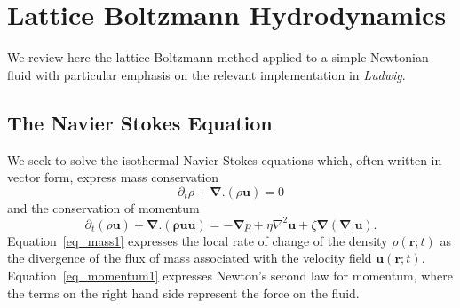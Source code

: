 %
%
%


\section{Lattice Boltzmann Hydrodynamics}
\label{section:lb-hydrodynamics}

We review here the lattice Boltzmann method applied to a simple
Newtonian fluid with particular emphasis on the relevant
implementation in \textit{Ludwig}.

\subsection{The Navier Stokes Equation}

We seek to solve the isothermal Navier-Stokes equations which, often
written in vector form, express mass conservation
\begin{equation}
\partial_t \rho + \boldsymbol{\nabla}.(\rho\mathbf{u}) = 0
\label{eq_mass1}
\end{equation}
and the conservation of momentum
\begin{equation}
\partial_t (\rho\mathbf{u}) + \boldsymbol{\nabla}.(\mathbf{\rho uu}) =
-\boldsymbol{\nabla}p + \eta \nabla^2 \mathbf{u}
+\zeta \boldsymbol{\nabla}(\boldsymbol{\nabla}.\mathbf{u}).
\label{eq_momentum1}
\end{equation}
Equation~\ref{eq_mass1} expresses the local rate of change of the
density $\rho(\mathbf{r}; t)$ as the divergence of the flux of
mass associated with the velocity field $\mathbf{u}(\mathbf{r}; t)$.
Equation~\ref{eq_momentum1} expresses Newton's second law for
momentum, where the terms on the right hand side represent the
force on the fluid.

